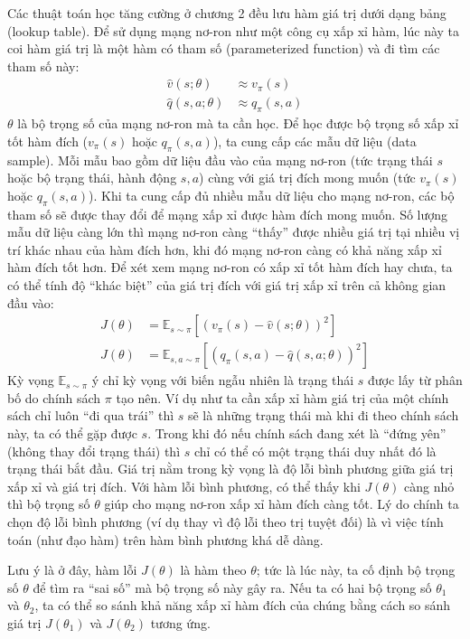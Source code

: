 	Các thuật toán học tăng cường ở chương 2 đều lưu hàm giá trị dưới dạng bảng (lookup table).
	Để sử dụng mạng nơ-ron như một công cụ xấp xỉ hàm, lúc này ta coi hàm giá trị là một hàm có tham số (parameterized function) và đi tìm các tham số này:
	\begin{align}
		\hat{v}(s;\theta) &\approx v_{\pi}(s)\\
		\hat{q}(s,a;\theta) &\approx q_{\pi}(s,a)
		\label{eq_DefVhatQhat}
	\end{align}
	$\theta$ là bộ trọng số của mạng nơ-ron mà ta cần học.
	Để học được bộ trọng số xấp xỉ tốt hàm đích ($v_{\pi}(s)$ hoặc $q_{\pi}(s,a)$), ta cung cấp các mẫu dữ liệu (data sample).
	Mỗi mẫu bao gồm dữ liệu đầu vào của mạng nơ-ron (tức trạng thái $s$ hoặc bộ trạng thái, hành động $s, a$) cùng với giá trị đích mong muốn (tức $v_{\pi}(s)$ hoặc $q_{\pi}(s,a)$).
	Khi ta cung cấp đủ nhiều mẫu dữ liệu cho mạng nơ-ron, các bộ tham số sẽ được thay đổi để mạng xấp xỉ được hàm đích mong muốn.
	Số lượng mẫu dữ liệu càng lớn thì mạng nơ-ron càng ``thấy'' được nhiều giá trị tại nhiều vị trí khác nhau của hàm đích hơn, khi đó mạng nơ-ron càng có khả năng xấp xỉ hàm đích tốt hơn.	
	Để xét xem mạng nơ-ron có xấp xỉ tốt hàm đích hay chưa, ta có thể tính độ ``khác biệt'' của giá trị đích với giá trị xấp xỉ trên cả không gian đầu vào:
	\begin{align}
		\label{eq_ExpectedErrorV}
		J(\theta) &= \mathbb{E}_{s \sim \pi}[(v_{\pi}(s) - \hat{v}(s;\theta))^2]\\
		\label{eq_ExpectedErrorQ}
		J(\theta) &= \mathbb{E}_{s,a \sim \pi}[(q_{\pi}(s,a) - \hat{q}(s,a;\theta))^2]
	\end{align}
	Kỳ vọng $\mathbb{E}_{s \sim \pi}$ ý chỉ kỳ vọng với biến ngẫu nhiên là trạng thái $s$ được lấy từ phân bố do chính sách $\pi$ tạo nên.
	Ví dụ như ta cần xấp xỉ hàm giá trị của một chính sách chỉ luôn ``đi qua trái'' thì $s$ sẽ là những trạng thái mà khi đi theo chính sách này, ta có thể gặp được $s$.
	Trong khi đó nếu chính sách đang xét là ``đứng yên'' (không thay đổi trạng thái) thì $s$ chỉ có thể có một trạng thái duy nhất đó là trạng thái bắt đầu.
	Giá trị nằm trong kỳ vọng là độ lỗi bình phương giữa giá trị xấp xỉ và giá trị đích.
	Với hàm lỗi bình phương, có thể thấy khi $J(\theta)$ càng nhỏ thì bộ trọng số $\theta$ giúp cho mạng nơ-ron xấp xỉ hàm đích càng tốt.
	Lý do chính ta chọn độ lỗi bình phương (ví dụ thay vì độ lỗi theo trị tuyệt đối) là vì việc tính toán (như đạo hàm) trên hàm bình phương khá dễ dàng.
	
	Lưu ý là ở đây, hàm lỗi $J(\theta)$ là hàm theo $\theta$; tức là lúc này, ta cố định bộ trọng số $\theta$ để tìm ra ``sai số'' mà bộ trọng số này gây ra.
	Nếu ta có hai bộ trọng số $\theta_1$ và $\theta_2$, ta có thể so sánh khả năng xấp xỉ hàm đích của chúng bằng cách so sánh giá trị $J(\theta_1)$ và $J(\theta_2)$ tương ứng.
	
